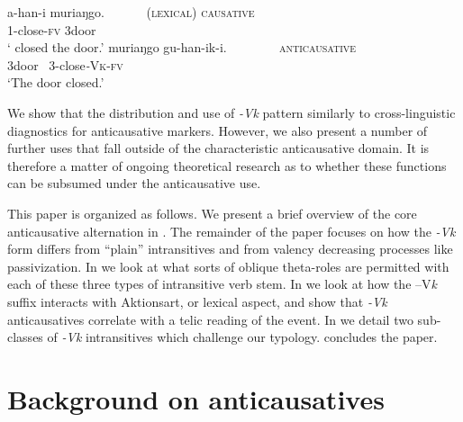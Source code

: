 \documentclass[output=paper]{langsci/lanmgscibook}
\begin{document}
\gll  {} a-han-i       muriaŋgo.~ ~ ~ ~     \textsc{(lexical) causative}\\
        1-close-\textsc{fv} 3door\\
\glt ‘ closed the door.’
\ex\label{ex:gluckman:2b}
\gll  muriaŋgo gu-han-ik-i.~ ~ ~ ~ ~     \textsc{anticausative}\\
       3door ~3-close\textit{-}\textsc{Vk}-\textsc{fv}\\
\glt ‘The door closed.’
\z
\z

We show that the distribution and use of \textit{-Vk} pattern similarly to cross-linguistic diagnostics for anticausative markers. However, we also present a number of further uses that fall outside of the characteristic anticausative domain. It is therefore a matter of ongoing theoretical research as to whether these functions can be subsumed under the anticausative use.
 
This paper is organized as follows. We present a brief overview of the core anticausative alternation in . The remainder of the paper focuses on how the \textit{-Vk} form differs from “plain” intransitives and from valency decreasing processes like passivization. In  we look at what sorts of oblique theta-roles are permitted with each of these three types of intransitive verb stem. In  we look at how the –V\textit{k} suffix interacts with Aktionsart, or lexical aspect, and show that \textit{-Vk} anticausatives correlate with a telic reading of the event. In  we detail two sub-classes of \textit{-Vk} intransitives which challenge our typology.  concludes the paper. 

\section{Background on anticausatives}\label{sec:gluckman:2}
\end{document}
